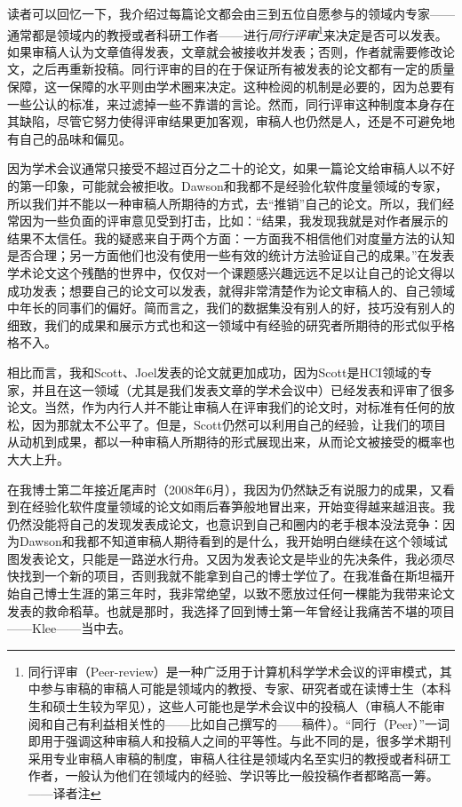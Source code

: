 \documentclass[letter,12pt]{book}
\begin{document}
\begin{CJK}{UTF8}{gbsn}
读者可以回忆一下，我介绍过每篇论文都会由三到五位自愿参与的领域内专家——通常都是领域内的教授或者科研工作者——进行\emph{同行评审}\footnote{同行评审（Peer-review）是一种广泛用于计算机科学学术会议的评审模式，其中参与审稿的审稿人可能是领域内的教授、专家、研究者或在读博士生（本科生和硕士生较为罕见），这些人可能也是学术会议中的投稿人（审稿人不能审阅和自己有利益相关性的——比如自己撰写的——稿件）。“同行（Peer）”一词即用于强调这种审稿人和投稿人之间的平等性。与此不同的是，很多学术期刊采用专业审稿人审稿的制度，审稿人往往是领域内名至实归的教授或者科研工作者，一般认为他们在领域内的经验、学识等比一般投稿作者都略高一筹。——译者注}来决定是否可以发表。如果审稿人认为文章值得发表，文章就会被接收并发表；否则，作者就需要修改论文，之后再重新投稿。同行评审的目的在于保证所有被发表的论文都有一定的质量保障，这一保障的水平则由学术圈来决定。这种检阅的机制是必要的，因为总要有一些公认的标准，来过滤掉一些不靠谱的言论。然而，同行评审这种制度本身存在其缺陷，尽管它努力使得评审结果更加客观，审稿人也仍然是人，还是不可避免地有自己的品味和偏见。

因为学术会议通常只接受不超过百分之二十的论文，如果一篇论文给审稿人以不好的第一印象，可能就会被拒收。Dawson和我都不是经验化软件度量领域的专家，所以我们并不能以一种审稿人所期待的方式，去“推销”自己的论文。所以，我们经常因为一些负面的评审意见受到打击，比如：“结果，我发现我就是对作者展示的结果不太信任。我的疑惑来自于两个方面：一方面我不相信他们对度量方法的认知是否合理；另一方面他们也没有使用一些有效的统计方法验证自己的成果。”在发表学术论文这个残酷的世界中，仅仅对一个课题感兴趣远远不足以让自己的论文得以成功发表；想要自己的论文可以发表，就得非常清楚作为论文审稿人的、自己领域中年长的同事们的偏好。简而言之，我们的数据集没有别人的好，技巧没有别人的细致，我们的成果和展示方式也和这一领域中有经验的研究者所期待的形式似乎格格不入。

相比而言，我和Scott、Joel发表的论文就更加成功，因为Scott是HCI领域的专家，并且在这一领域（尤其是我们发表文章的学术会议中）已经发表和评审了很多论文。当然，作为内行人并不能让审稿人在评审我们的论文时，对标准有任何的放松，因为那就太不公平了。但是，Scott仍然可以利用自己的经验，让我们的项目从动机到成果，都以一种审稿人所期待的形式展现出来，从而论文被接受的概率也大大上升。

\breakline

在我博士第二年接近尾声时（2008年6月），我因为仍然缺乏有说服力的成果，又看到在经验化软件度量领域的论文如雨后春笋般地冒出来，开始变得越来越沮丧。我仍然没能将自己的发现发表成论文，也意识到自己和圈内的老手根本没法竞争：因为Dawson和我都不知道审稿人期待看到的是什么，我开始明白继续在这个领域试图发表论文，只能是一路逆水行舟。又因为发表论文是毕业的先决条件，我必须尽快找到一个新的项目，否则我就不能拿到自己的博士学位了。在我准备在斯坦福开始自己博士生涯的第三年时，我非常绝望，以致不愿放过任何一棵能为我带来论文发表的救命稻草。也就是那时，我选择了回到博士第一年曾经让我痛苦不堪的项目——Klee——当中去。


\end{CJK}
\end{document}
